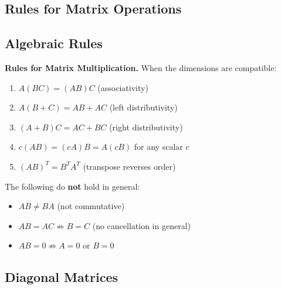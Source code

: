 
\subsection{Rules for Matrix Operations}

\subsection*{Algebraic Rules}

\begin{remark*}[Exposition]
\textbf{Rules for Matrix Multiplication.}
When the dimensions are compatible:
\begin{enumerate}
  \item $A(BC) = (AB)C$ \hfill (associativity)
  \item $A(B + C) = AB + AC$ \hfill (left distributivity)
  \item $(A + B)C = AC + BC$ \hfill (right distributivity)
  \item $c(AB) = (cA)B = A(cB)$ for any scalar $c$
  \item $(AB)^T = B^T A^T$ \hfill (transpose reverses order)
\end{enumerate}
The following do \textbf{not} hold in general:
\begin{itemize}
  \item $AB \neq BA$ (not commutative)
  \item $AB = AC \not\Rightarrow B = C$ (no cancellation in general)
  \item $AB = 0 \not\Rightarrow A = 0$ or $B = 0$
\end{itemize}
\end{remark*}

\subsection*{Diagonal Matrices}

